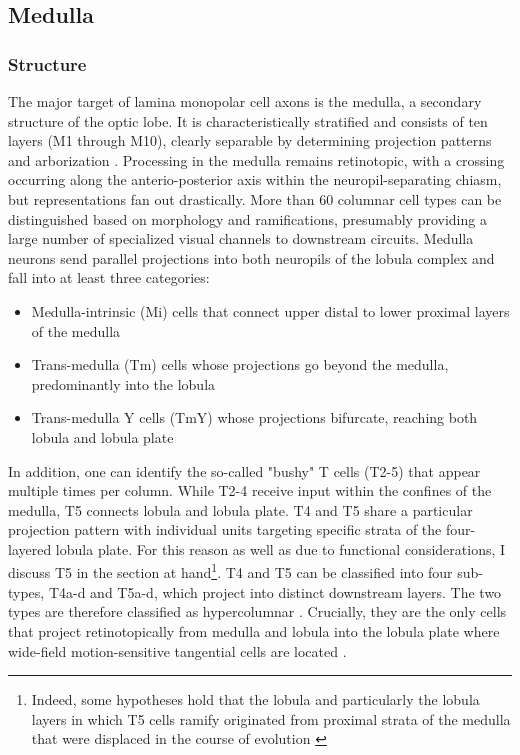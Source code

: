 \subsection{Medulla}

\subsubsection{Structure}
The major target of lamina monopolar cell axons is the medulla, a secondary structure of the optic lobe. It is characteristically stratified and consists of ten layers (M1 through M10), clearly separable by determining projection patterns and arborization \citep{Fischbach:1989uw}. Processing in the medulla remains retinotopic, with a crossing occurring along the anterio-posterior axis within the neuropil-separating chiasm, but representations fan out drastically. More than 60 columnar cell types can be distinguished based on morphology and ramifications, presumably providing a large number of specialized visual channels to downstream circuits. Medulla neurons send parallel projections into both neuropils of the lobula complex and fall into at least three categories:

\begin{itemize}
    \item Medulla-intrinsic (Mi) cells that connect upper distal to lower proximal layers of the medulla
    \item Trans-medulla (Tm) cells whose projections go beyond the medulla, predominantly into the lobula
    \item Trans-medulla Y cells (TmY) whose projections bifurcate, reaching both lobula and lobula plate
\end{itemize}

In addition, one can identify the so-called "bushy" T cells (T2-5) that appear multiple times per column. While T2-4 receive input within the confines of the medulla, T5 connects lobula and lobula plate. T4 and T5 share a particular projection pattern with individual units targeting specific strata of the four-layered lobula plate. For this reason as well as due to functional considerations, I discuss T5 in the section at hand\footnote{Indeed, some hypotheses hold that the lobula and particularly the lobula layers in which T5 cells ramify originated from proximal strata of the medulla that were displaced in the course of evolution \citep{Douglass:1996aa,Shinomiya:2015aa}}. T4 and T5 can be classified into four sub-types, T4a-d and T5a-d, which project into distinct downstream layers. The two types are therefore classified as hypercolumnar \citep{Bausenwein:1992vx}. Crucially, they are the only cells that project retinotopically from medulla and lobula into the lobula plate where wide-field motion-sensitive tangential cells are located \citep{Fischbach:1989uw,Douglass:1996aa}.

